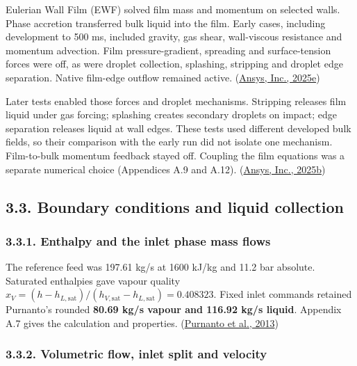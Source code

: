 \documentclass[
  12pt,
  a4paper,
]{article}
\begin{document}
Eulerian Wall Film (EWF) solved film mass and momentum on selected
walls. Phase accretion transferred bulk liquid into the film. Early
cases, including development to 500 ms, included gravity, gas shear,
wall-viscous resistance and momentum advection. Film pressure-gradient,
spreading and surface-tension forces were off, as were droplet
collection, splashing, stripping and droplet edge separation. Native
film-edge outflow remained active.
(\href{https://ansyshelp.ansys.com/public/Views/Secured/corp/v252/en/flu_ug/flu_ug_ewf_sec_options.html}{Ansys,
Inc., 2025e})

Later tests enabled those forces and droplet mechanisms. Stripping
releases film liquid under gas forcing; splashing creates secondary
droplets on impact; edge separation releases liquid at wall edges. These
tests used different developed bulk fields, so their comparison with the
early run did not isolate one mechanism. Film-to-bulk momentum feedback
stayed off. Coupling the film equations was a separate numerical choice
(Appendices A.9 and A.12).
(\href{https://ansyshelp.ansys.com/public/Views/Secured/corp/v252/en/flu_th/flu_th_ewf_sec_film_submodels.html}{Ansys,
Inc., 2025b})

\subsection{3.3. Boundary conditions and liquid
collection}\label{boundary-conditions-and-liquid-collection}

\subsubsection{3.3.1. Enthalpy and the inlet phase mass
flows}\label{enthalpy-and-the-inlet-phase-mass-flows}

The reference feed was 197.61 kg/s at 1600 kJ/kg and 11.2 bar absolute.
Saturated enthalpies gave vapour quality
\(x_V=(h-h_{L,\mathrm{sat}})/(h_{V,\mathrm{sat}}-h_{L,\mathrm{sat}})=0.408323\).
Fixed inlet commands retained Purnanto's rounded \textbf{80.69 kg/s
vapour and 116.92 kg/s liquid}. Appendix A.7 gives the calculation and
properties.
(\href{https://www.researchgate.net/publication/269519626_CFD_MODELLING_OF_TWO-PHASE_FLOW_INSIDE_GEOTHERMAL_STEAM-WATER_SEPARATORS}{Purnanto
et al., 2013})

\subsubsection{3.3.2. Volumetric flow, inlet split and
velocity}\label{volumetric-flow-inlet-split-and-velocity}
\end{document}
